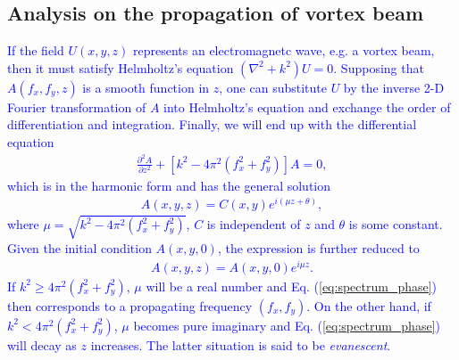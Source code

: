 \subsection{Analysis on the propagation of vortex beam}
\textcolor{blue}{
If the field $U(x, y, z)$ represents an electromagnetc wave, e.g. a vortex beam, then it must satisfy Helmholtz's equation $(\nabla^2 + k^2) U  = 0$. Supposing that $A(f_x, f_y, z)$ is a smooth function in $z$, one can substitute $U$ by the inverse 2-D Fourier transformation of $A$ into Helmholtz's equation and exchange the order of differentiation and integration. Finally, we will end up with the differential equation
\begin{eqnarray}
	\frac{\partial^2 A}{\partial z^2} + \left[ k^2 - 4\pi^2\left( f_x^2 + f_y^2 \right) \right] A = 0,
	\nonumber
\end{eqnarray}
which is in the harmonic form and has the general solution
\begin{eqnarray}
	A(x, y, z) = C(x, y) e^{i (\mu z + \theta)},
	\nonumber
\end{eqnarray}
where $\mu = \sqrt{k^2 - 4\pi^2\left( f_x^2 + f_y^2 \right)}$, $C$ is independent of $z$ and $\theta$ is some constant. Given the initial condition $A(x, y, 0)$, the expression is further reduced to
\begin{eqnarray}
	A(x, y, z) = A(x, y, 0) e^{i \mu z}.
	\label{eq:spectrum_phase}
\end{eqnarray}
If $k^2 \ge 4\pi^2 (f_x^2 + f_y^2)$, $\mu$ will be a real number and Eq. (\ref{eq:spectrum_phase}) then corresponds to a propagating frequency $(f_x, f_y)$. On the other hand, if $k^2 < 4\pi^2 (f_x^2 + f_y^2)$, $\mu$ becomes pure imaginary and Eq. (\ref{eq:spectrum_phase}) will decay as $z$ increases. The latter situation is said to be {\em evanescent}.
}

